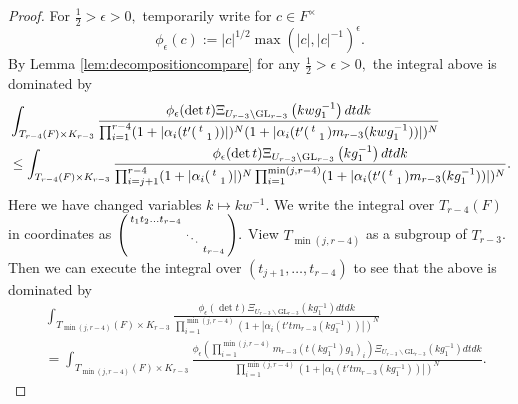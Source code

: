 \documentclass[12pt]{amsart}
\theoremstyle{remark}
\numberwithin{equation}{section}
\newcommand{\GL}{\mathrm{GL}}
\theoremstyle{definition}
\newenvironment{psmatrix}
  {\left(\begin{smallmatrix}}
  {\end{smallmatrix}\right)}
\numberwithin{equation}{subsection}
\begin{document}
\begin{proof}
For $\tfrac{1}{2}>\epsilon>0,$ temporarily write for $c\in F^\times$
$$
\phi_\epsilon(c):=|c|^{1/2}\max(|c|,|c|^{-1})^{\epsilon}.
$$
By Lemma \ref{lem:decompositioncompare} for any $\tfrac{1}{2}>\epsilon>0,$ the integral above is dominated by
\begin{align*}
    &\int_{ T_{r-4}(F) \times K_{r-3}} \frac{\phi_\epsilon(\det t)\Xi_{U_{r-3} \backslash \GL_{r-3}}\left(kwg_1^{-1}\right)dtdk}{
  \prod_{i=1}^{r-4}(1+|\alpha_i(t'\begin{psmatrix}t & \\ & 1\end{psmatrix})|)^{N}(1+|\alpha_i(t'\begin{psmatrix} t & \\ & 1 \end{psmatrix}m_{r-3}(k wg_1^{-1}))|)^{N}}\\
  & \le \int_{ T_{r-4}(F) \times K_{r-3}} \frac{\phi_\epsilon(\det t)\Xi_{U_{r-3} \backslash \GL_{r-3}}\left(kg_1^{-1}\right)dtdk}{
  \prod_{i=j+1}^{r-4}(1+|\alpha_i\begin{psmatrix}
      t & \\
      & 1
  \end{psmatrix}|)^{N} \prod_{i=1}^{\min(j,r-4)}(1+|\alpha_i(t'\begin{psmatrix} t & \\ & 1 \end{psmatrix}m_{r-3}(kg_1^{-1}))|)^{N}}.
\end{align*}
Here we have changed variables $k \mapsto kw^{-1}.$
We write the integral over $T_{r-4}(F)$ in coordinates as 
$\begin{psmatrix} t_1t_2\dots t_{r-4} & & \\ & \ddots & \\ & & t_{r-4} \end{psmatrix}.$ View $T_{\min(j,r-4)}$ as a subgroup of $T_{r-3}$. Then we can execute the integral over $(t_{j+1},\dots,t_{r-4})$ to see that the above is dominated by 
\begin{align*}
&\int_{T_{\min(j,r-4)}(F) \times K_{r-3}}\frac{\phi_\epsilon\left(\det t\right)\Xi_{U_{r-3} \backslash \GL_{r-3}}(kg_1^{-1})dtdk}{\prod_{i=1}^{\min(j,r-4)}\left(1+\left|\alpha_i\left(t'tm_{r-3}\left(k g_1^{-1}\right)\right)\right|\right)^{N}}\\
&=\int_{T_{\min(j,r-4)}(F) \times K_{r-3}}\frac{\phi_\epsilon\left(\prod_{i=1}^{\min(j,r-4)}m_{r-3}(t(kg_1^{-1})g_1)_i\right)\Xi_{U_{r-3} \backslash \GL_{r-3}}(kg_1^{-1})dtdk}{\prod_{i=1}^{\min(j,r-4)}\left(1+\left|\alpha_i\left(t'tm_{r-3}\left(k g_1^{-1}\right)\right)\right|\right)^{N}}.
\end{align*}


\end{proof}
\end{document}

